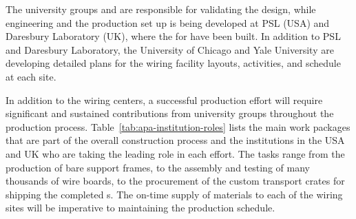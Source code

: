



The university groups and  are responsible for validating  the design, while engineering and the production set up is being developed at PSL %
(USA) and Daresbury Laboratory (UK), where the  for  have been built. 
In addition to PSL and Daresbury Laboratory, the University of Chicago and Yale University are developing detailed plans for the wiring facility layouts, activities, and schedule at each site. 

In addition to the wiring centers, a successful production effort will require significant and sustained contributions from university groups throughout the production process.  Table~\ref{tab:apa-institution-roles} lists the main work packages that are part of the overall  construction process and the institutions in the USA and UK who are taking the leading role in each effort.  The tasks range from the production of bare support frames, to the assembly and testing of many thousands of wire boards, to the procurement of the custom transport crates for shipping the completed s.  The on-time supply of materials to each of the wiring sites will be imperative to maintaining the production schedule.  

